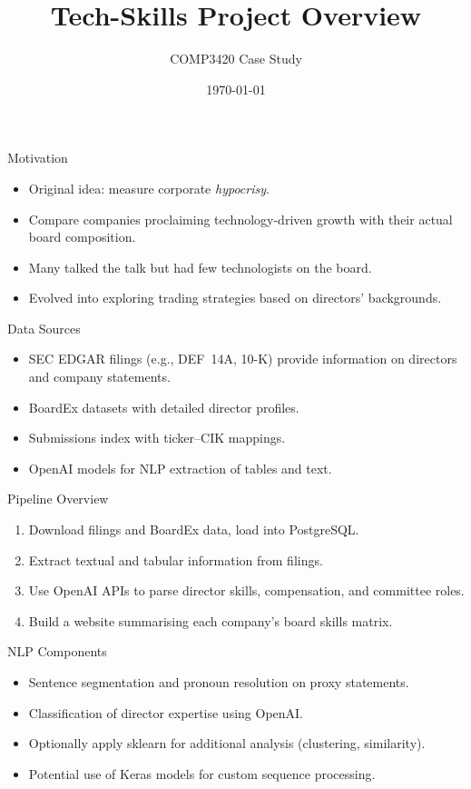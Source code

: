 \documentclass{beamer}
\title{Tech-Skills Project Overview}
\author{COMP3420 Case Study}
\date{\today}
\begin{document}
\begin{frame}
  \titlepage
\end{frame}

\begin{frame}{Motivation}
  \begin{itemize}
    \item Original idea: measure corporate \emph{hypocrisy}.
    \item Compare companies proclaiming technology-driven growth with their actual board composition.
    \item Many talked the talk but had few technologists on the board.
    \item Evolved into exploring trading strategies based on directors' backgrounds.
  \end{itemize}
\end{frame}

\begin{frame}{Data Sources}
  \begin{itemize}
    \item SEC EDGAR filings (e.g., DEF~14A, 10-K) provide information on directors and company statements.
    \item BoardEx datasets with detailed director profiles.
    \item Submissions index with ticker--CIK mappings.
    \item OpenAI models for NLP extraction of tables and text.
  \end{itemize}
\end{frame}

\begin{frame}{Pipeline Overview}
  \begin{enumerate}
    \item Download filings and BoardEx data, load into PostgreSQL.
    \item Extract textual and tabular information from filings.
    \item Use OpenAI APIs to parse director skills, compensation, and committee roles.
    \item Build a website summarising each company's board skills matrix.
  \end{enumerate}
\end{frame}

\begin{frame}{NLP Components}
  \begin{itemize}
    \item Sentence segmentation and pronoun resolution on proxy statements.
    \item Classification of director expertise using OpenAI.
    \item Optionally apply sklearn for additional analysis (clustering, similarity).
    \item Potential use of Keras models for custom sequence processing.
  \end{itemize}
\end{frame}
\end{document}
